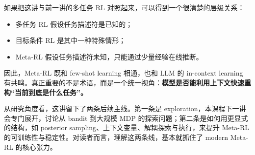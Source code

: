 \documentclass[a4paper]{article}
\begin{document}
如果把这讲与前一讲的多任务 RL 对照起来，可以得到一个很清楚的层级关系：
\begin{itemize}
\item 多任务 RL 假设任务描述符是已知的；
\item 目标条件 RL 是其中一种特殊情形；
\item Meta-RL 假设任务描述符未知，只能通过少量经验在线推断。
\end{itemize}

因此，Meta-RL 既和 few-shot learning 相通，也和 LLM 的 in-context learning 有共鸣。真正重要的不是术语，而是一个统一视角：\textbf{模型是否能利用上下文快速重构“当前到底是什么任务”。}

从研究角度看，这讲留下了两条后续主线。第一条是 exploration，本课程下一讲会专门展开，讨论从 bandit 到大规模 MDP 的探索问题；第二条是如何用更显式的结构，如 posterior sampling、上下文变量、解耦探索与执行，来提升 Meta-RL 的可训练性与稳定性。对读者而言，理解这两条线，基本就抓住了 modern Meta-RL 的核心张力。
\end{document}
